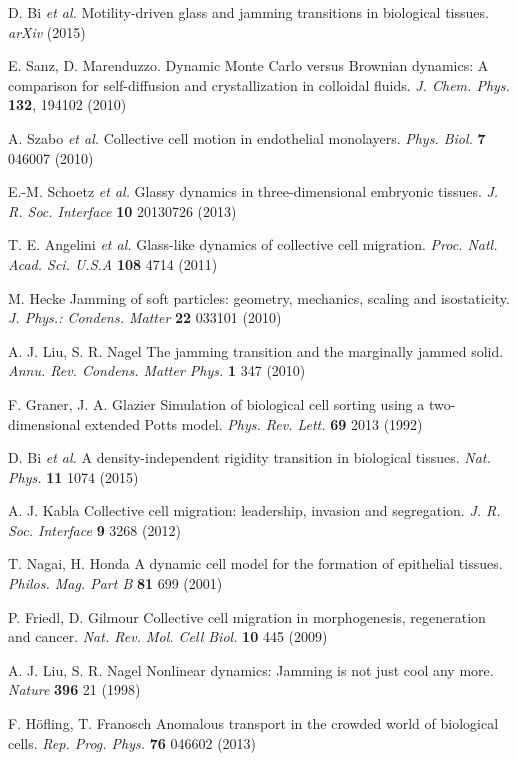 \documentclass[a4paper,12pt]{article}
\newcommand{\etal}{\emph{et al. }}
\begin{document}
%   
%
\begin{thebibliography}{99}
		D. Bi \etal
		Motility-driven glass and jamming transitions in biological tissues.
		\emph{arXiv}
		(2015)
	
		E. Sanz, D. Marenduzzo.
		Dynamic Monte Carlo versus Brownian dynamics: A comparison for self-diffusion and crystallization in colloidal fluids.
		\emph{J. Chem. Phys.}
		\textbf{132}, 194102 (2010)
	
		A. Szabo \etal
		Collective cell motion in endothelial monolayers.
		\emph{Phys. Biol.}
		\textbf{7} 046007 (2010)
		
		E.-M. Schoetz \etal
		Glassy dynamics in three-dimensional embryonic tissues.
		\emph{J. R. Soc. Interface}
		\textbf{10} 20130726 (2013)
	
		T. E. Angelini \etal
		Glass-like dynamics of collective cell migration.
		\emph{Proc. Natl. Acad. Sci. U.S.A}
		\textbf{108} 4714 (2011)
	
		M. Hecke
		Jamming of soft particles: geometry, mechanics, scaling and isostaticity.
		\emph{J. Phys.: Condens. Matter}
		\textbf{22} 033101 (2010)
	
		A. J. Liu, S. R. Nagel
		The jamming transition and the marginally jammed solid.
		\emph{Annu. Rev. Condens. Matter Phys.}
		\textbf{1} 347 (2010)
		
		F. Graner, J. A. Glazier
		Simulation of biological cell sorting using a two-dimensional extended Potts model.
		\emph{Phys. Rev. Lett.}
		\textbf{69} 2013 (1992)
	
		D. Bi \etal
		A density-independent rigidity transition in biological tissues.
		\emph{Nat. Phys.}
		\textbf{11} 1074 (2015)
		
		A. J. Kabla
		Collective cell migration: leadership, invasion and segregation.
		\emph{J. R. Soc. Interface}
		\textbf{9} 3268 (2012)
	
		T. Nagai, H. Honda
		A dynamic cell model for the formation of epithelial tissues.
		\emph{Philos. Mag. Part B}
		\textbf{81} 699 (2001)
	
		P. Friedl, D. Gilmour
		Collective cell migration in morphogenesis, regeneration and cancer.
		\emph{Nat. Rev. Mol. Cell Biol.}
		\textbf{10} 445 (2009)
	
		A. J. Liu, S. R. Nagel
		Nonlinear dynamics: Jamming is not just cool any more.
		\emph{Nature}
		\textbf{396} 21 (1998)
		
		F. H\"ofling, T. Franosch
		Anomalous transport in the crowded world of biological cells.
		\emph{Rep. Prog. Phys.}
		\textbf{76} 046602 (2013)
	
	

\end{thebibliography}
\end{document}
